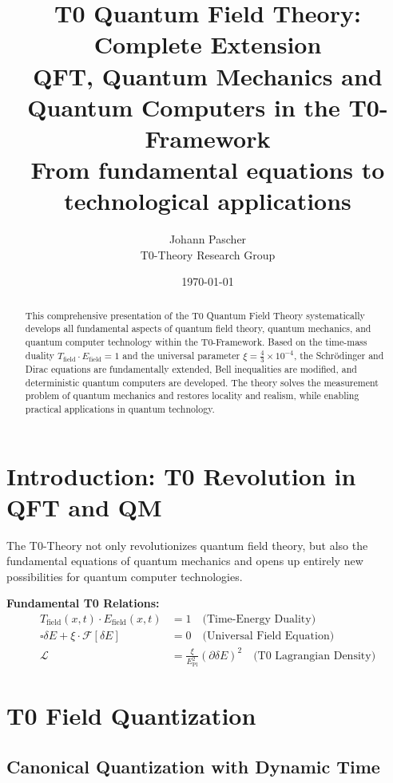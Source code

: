 \documentclass[12pt,a4paper]{article}
\title{T0 Quantum Field Theory: Complete Extension \\
	QFT, Quantum Mechanics and Quantum Computers in the T0-Framework \\
	\large From fundamental equations to technological applications}
\author{Johann Pascher \\
	T0-Theory Research Group}
\date{\today}
\newcommand{\Efield}{E_{\text{field}}}
\newcommand{\xipar}{\xi}
\newcommand{\deltaE}{\delta E}
\newcommand{\EPlanck}{E_{\text{Pl}}}
\begin{document}
	
	\maketitle
	
	\begin{abstract}
		This comprehensive presentation of the T0 Quantum Field Theory systematically develops all fundamental aspects of quantum field theory, quantum mechanics, and quantum computer technology within the T0-Framework. Based on the time-mass duality $T_{\text{field}} \cdot \Efield = 1$ and the universal parameter $\xipar = \frac{4}{3} \times 10^{-4}$, the Schrödinger and Dirac equations are fundamentally extended, Bell inequalities are modified, and deterministic quantum computers are developed. The theory solves the measurement problem of quantum mechanics and restores locality and realism, while enabling practical applications in quantum technology.
	\end{abstract}
	
	\tableofcontents
	\newpage
	
	\section{Introduction: T0 Revolution in QFT and QM}
	
	The T0-Theory not only revolutionizes quantum field theory, but also the fundamental equations of quantum mechanics and opens up entirely new possibilities for quantum computer technologies.
	
	\begin{tcolorbox}[colback=blue!5!white,colframe=blue!75!black,title={T0 Basic Principles for QFT and QM}]
		\textbf{Fundamental T0 Relations:}
		\begin{align}
			T_{\text{field}}(x,t) \cdot \Efield(x,t) &= 1 \quad \text{(Time-Energy Duality)} \\
			\square \deltaE + \xipar \cdot \mathcal{F}[\deltaE] &= 0 \quad \text{(Universal Field Equation)} \\
			\mathcal{L} &= \frac{\xipar}{\EPlanck^2} (\partial \deltaE)^2 \quad \text{(T0 Lagrangian Density)}
		\end{align}
	\end{tcolorbox}
	
	\section{T0 Field Quantization}
	
	\subsection{Canonical Quantization with Dynamic Time}
	
\end{document}
